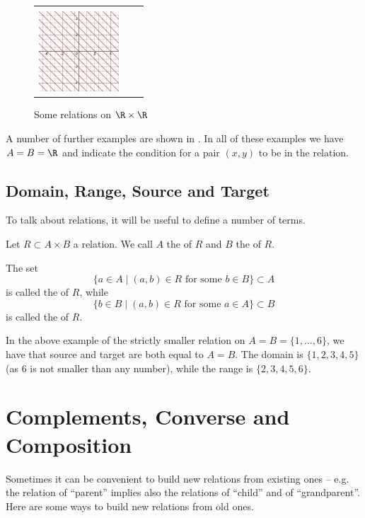 \begin{figure}[t]
\begin{center}
\begin{tabular}{lll}
\begin{minipage}[t]{3.5cm}
\end{minipage}&\begin{minipage}[t]{3.5cm}
i) $x+y\in\Z$\\
\includegraphics[width=3cm]{pic/relsample9.png}
\end{minipage}\\
\end{tabular}
\end{center}
\caption{Some relations on $\R\times\R$}
\label{figsomeRelations}
\end{figure}

A number of further examples are shown in
. In all of these examples we have $A=B=\R$ and
indicate the condition for a pair $(x,y)$ to be in the relation.

\subsection{Domain, Range, Source and Target}

To talk about relations, it will be useful to define a number of terms.
\begin{defn}
Let $R\subset A\times B$ a relation. We call $A$ the  of $R$
and $B$ the  of $R$.

The set
\[
\{a\in A\mid (a,b)\in R\mbox{\ for some $b\in B$}\}\subset A
\]
is called the  of $R$, while
\[
\{b\in B\mid (a,b)\in R\mbox{\ for some $a\in A$}\}\subset B
\]
is called the  of $R$.
\end{defn}

In the above example of the strictly smaller relation on $A=B=\{1,\ldots,6\}$,
we have that source and target are both equal to $A=B$. The domain is
$\{1,2,3,4,5\}$ (as $6$ is not smaller than any number), while the range is
$\{2,3,4,5,6\}$.

\section{Complements, Converse and Composition}

Sometimes it can be convenient to build new relations from existing ones --
e.g. the relation of ``parent'' implies also the relations of ``child'' and
of ``grandparent''. Here are some ways to build new relations from old ones.
\medskip

